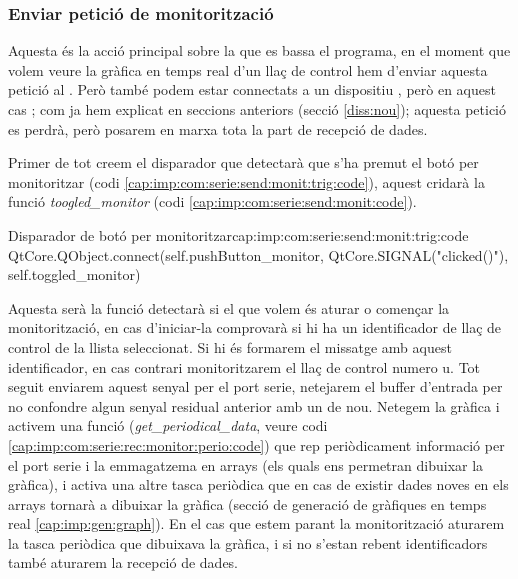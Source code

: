 \subsubsection{Enviar petició de monitorització}\label{cap:imp:com:serie:send:monit}

Aquesta és la acció principal sobre la que es bassa el programa, en el moment que volem veure la gràfica en temps real d'un llaç de control hem d'enviar aquesta petició al \Monitor. Però també podem estar connectats a un dispositiu \SensorActuador, però en aquest cas ; com ja hem explicat en seccions anteriors (secció \ref{diss:nou}); aquesta petició es perdrà, però posarem en marxa tota la part de recepció de dades.

Primer de tot creem el disparador que detectarà que s'ha premut el botó per monitoritzar (codi \ref{cap:imp:com:serie:send:monit:trig:code}), aquest cridarà la funció \emph{toogled\_monitor} (codi \ref{cap:imp:com:serie:send:monit:code}).

\begin{code_python}{Disparador de botó per monitoritzar}{cap:imp:com:serie:send:monit:trig:code}
QtCore.QObject.connect(self.pushButton_monitor, QtCore.SIGNAL("clicked()"), self.toggled_monitor)
\end{code_python}

Aquesta serà la funció detectarà si el que volem és aturar o començar la monitorització, en cas d'iniciar-la comprovarà si hi ha un identificador de llaç de control de la llista seleccionat. Si hi és formarem el missatge amb aquest identificador, en cas contrari monitoritzarem el llaç de control numero u. Tot seguit enviarem aquest senyal per el port serie, netejarem el buffer d'entrada per no confondre algun senyal residual anterior amb un de nou. Netegem la gràfica i activem una funció (\emph{get\_periodical\_data}, veure codi \ref{cap:imp:com:serie:rec:monitor:perio:code}) que rep periòdicament informació per el port serie i la emmagatzema en arrays (els quals ens permetran dibuixar la gràfica), i activa una altre tasca periòdica que en cas de existir dades noves en els arrays tornarà a dibuixar la gràfica (secció de generació de gràfiques en temps real \ref{cap:imp:gen:graph}).
En el cas que estem parant la monitorització aturarem la tasca periòdica que dibuixava la gràfica, i si no s'estan rebent identificadors també aturarem la recepció de dades.

